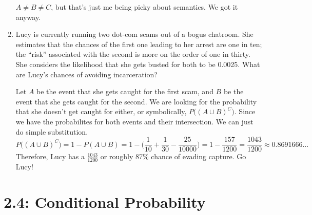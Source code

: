 \documentclass{article}
\begin{document}
\begin{enumerate}
\begin{solution}
{        \(A\neq{}B\neq{}C\), but that's just me being picky about semantics. We got it anyway. } 
    \end{solution}
    \item Lucy is currently running two dot-com scams out of a bogus chatroom. She estimates that the chances of the first one leading to her arrest are one in ten; the ``risk''
    associated with the second is more on the order of one in thirty. She considers the likelihood that she gets busted for both to be 0.0025. What are Lucy's chances of avoiding
    incarceration?\begin{solution}
        Let \(A\) be the event that she gets caught for the first scam, and \(B\) be the event that she gets caught for the second. We are looking for the probability that she doesn't get caught for either, 
        or symbolically, \(P\big({(A\cup{}B)}^C\big)\). Since we have the probabilites for both events and their intersection. We can just do simple substitution.\[
            P\big({(A\cup{}B)}^C\big) = 1 - P(A\cup{}B) = 1 - \biggl(\frac{1}{10} + \frac{1}{30} - \frac{25}{10000}\biggr) = 1 - \frac{157}{1200} = \frac{1043}{1200} \approx 0.8691666\ldots
        \] Therefore, Lucy has a \(\frac{1043}{1200}\) or roughly 87\% chance of evading capture. Go Lucy!
    \end{solution}
\end{enumerate}

\pagebreak
\section*{2.4: Conditional Probability}
\end{document}
